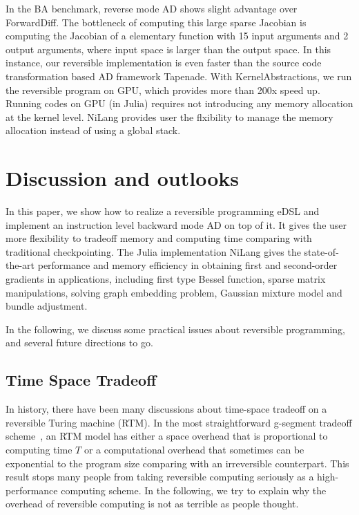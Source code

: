 \documentclass{article}
\newcommand{\<}{\langle}
\renewcommand{\>}{\rangle}
\theoremstyle{definition}\newtheorem{definition}{\textit{Definition}}
\begin{document}
In the BA benchmark, reverse mode AD shows slight advantage over ForwardDiff.
The bottleneck of computing this large sparse Jacobian is computing the Jacobian of a elementary function with 15 input arguments and 2 output arguments, where input space is larger than the output space.
In this instance, our reversible implementation is even faster than the source code transformation based AD framework Tapenade.
With KernelAbstractions, we run the reversible program on GPU, which provides more than 200x speed up.
Running codes on GPU (in Julia) requires not introducing any memory allocation at the kernel level.
NiLang provides user the flxibility to manage the memory allocation instead of using a global stack.

\section{Discussion and outlooks}\label{sec:discussion}
In this paper, we show how to realize a reversible programming eDSL and implement an instruction level backward mode AD on top of it.
It gives the user more flexibility to tradeoff memory and computing time comparing with traditional checkpointing.
The Julia implementation NiLang gives the state-of-the-art performance and memory efficiency in obtaining first and second-order gradients in applications, including first type Bessel function, sparse matrix manipulations, solving graph embedding problem, Gaussian mixture model and bundle adjustment.

In the following, we discuss some practical issues about reversible programming, and several future directions to go.

\subsection{Time Space Tradeoff}\label{sec:timespace}
In history, there have been many discussions about time-space tradeoff on a reversible Turing machine (RTM).
In the most straightforward g-segment tradeoff scheme~\cite{Bennett1989,Levine1990}, an RTM model has either a space overhead that is proportional to computing time $T$ or a computational overhead that sometimes can be exponential to the program size comparing with an irreversible counterpart.
This result stops many people from taking reversible computing seriously as a high-performance computing scheme.
In the following, we try to explain why the overhead of reversible computing is not as terrible as people thought.
\end{document}
